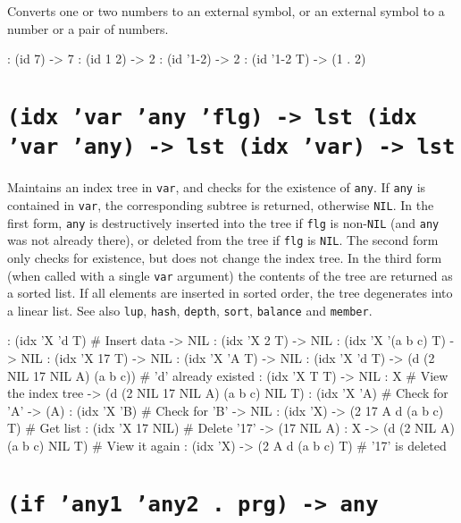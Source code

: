 Converts one or two numbers to an external symbol, or an external symbol
to a number or a pair of numbers.


\begin{wideverbatim}
: (id 7)
-> {7}
: (id 1 2)
-> {2}
: (id '{1-2})
-> 2
: (id '{1-2} T)
-> (1 . 2)
\end{wideverbatim}

 
\section*{\texttt{(idx 'var 'any 'flg) -> lst (idx 'var 'any) -> lst (idx 'var) -> lst}}
\label{sec:func-ref-I-(idx 'var 'any 'flg) -> lst (idx 'var 'any) -> lst (idx 'var) -> lst}


Maintains an index tree in \texttt{var}, and checks for the existence of \texttt{any}.
If \texttt{any} is contained in \texttt{var}, the corresponding subtree is returned,
otherwise \texttt{NIL}. In the first form, \texttt{any} is destructively inserted into
the tree if \texttt{flg} is non-\texttt{NIL} (and \texttt{any} was not already there), or
deleted from the tree if \texttt{flg} is \texttt{NIL}. The second form only checks for
existence, but does not change the index tree. In the third form (when
called with a single \texttt{var} argument) the contents of the tree are
returned as a sorted list. If all elements are inserted in sorted order,
the tree degenerates into a linear list. See also \texttt{lup}, \texttt{hash},
\texttt{depth}, \texttt{sort}, \texttt{balance} and \texttt{member}.


\begin{wideverbatim}
: (idx 'X 'd T)                              # Insert data
-> NIL
: (idx 'X 2 T)
-> NIL
: (idx 'X '(a b c) T)
-> NIL
: (idx 'X 17 T)
-> NIL
: (idx 'X 'A T)
-> NIL
: (idx 'X 'd T)
-> (d (2 NIL 17 NIL A) (a b c))              # 'd' already existed
: (idx 'X T T)
-> NIL
: X                                          # View the index tree
-> (d (2 NIL 17 NIL A) (a b c) NIL T)
: (idx 'X 'A)                                # Check for 'A'
-> (A)
: (idx 'X 'B)                                # Check for 'B'
-> NIL
: (idx 'X)
-> (2 17 A d (a b c) T)                      # Get list
: (idx 'X 17 NIL)                            # Delete '17'
-> (17 NIL A)
: X
-> (d (2 NIL A) (a b c) NIL T)               # View it again
: (idx 'X)
-> (2 A d (a b c) T)                         # '17' is deleted
\end{wideverbatim}

 
\section*{\texttt{(if 'any1 'any2 . prg) -> any}}
\label{sec:func-ref-I-(if 'any1 'any2 . prg) -> any}


